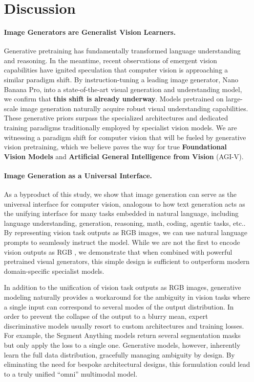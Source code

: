 \documentclass[11pt, a4paper, copyright, gdm]{google}
\begin{document}
\section{Discussion}

\paragraph{Image Generators are Generalist Vision Learners.}
Generative pretraining \citep{radford2018improving_gpt1,radford2019language_gpt2,brown2020language_gpt3} has fundamentally transformed language understanding and reasoning. 
In the meantime, recent observations of emergent vision capabilities \citep{wiedemer2025veo_learner,zuo2025nanobanana_low_level} have ignited speculation that computer vision is approaching a similar paradigm shift.
By instruction-tuning a leading image generator, Nano Banana Pro, into a state-of-the-art visual generation and understanding model, we confirm that \textbf{this shift is already underway}.
Models pretrained on large-scale image generation naturally acquire robust visual understanding capabilities.
These generative priors surpass the specialized architectures and dedicated training paradigms traditionally employed by specialist vision models.
We are witnessing a paradigm shift for computer vision that will be fueled by generative vision pretraining, which we believe paves the way for true \textbf{Foundational Vision Models} and \textbf{Artificial General Intelligence from Vision} (AGI-V).


\paragraph{Image Generation as a Universal Interface.}
As a byproduct of this study, we show that image generation can serve as the universal interface for computer vision, analogous to how text generation acts as the unifying interface for many tasks embedded in natural language, including language understanding, generation, reasoning, math, coding, agentic tasks, etc.. 
By representing vision task outputs as RGB images, we can use natural language prompts to seamlessly instruct the model. While we are not the first to encode vision outputs as RGB \citep{marigold,zhao2025diception}, we demonstrate that when combined with powerful pretrained visual generators, this simple design is sufficient to outperform modern domain-specific specialist models.

In addition to the unification of vision task outputs as RGB images, generative modeling naturally provides a workaround for the ambiguity in vision tasks where a single input can correspond to several modes of the output distribution. 
In order to prevent the collapse of the output to a blurry mean, expert discriminative models \citep{sam3,dav3} usually resort to custom architectures and training losses. 
For example, the Segment Anything models \citep{kirillov2023segment,ravi2024sam2,sam3} return several segmentation masks but only apply the loss to a single one.
Generative models, however, inherently learn the full data distribution, gracefully managing ambiguity by design.
By eliminating the need for bespoke architectural designs, this formulation could lead to a truly unified ``omni'' multimodal model.
\end{document}
